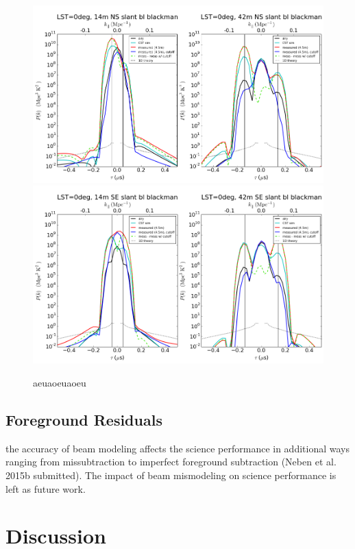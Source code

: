 \documentclass[preprint]{aastex}
\begin{document}
\begin{figure}[h]
\includegraphics[width=5.5in]{LST0deg_14m_42m_NSslantbaselinesblackman.png}
\includegraphics[width=5.5in]{LST0deg_14m_42m_SEslantbaselinesblackman.png}
\caption{aeuaoeuaoeu}
\label{fig:delayspec2}
\end{figure}


\subsection{Foreground Residuals}
the accuracy of beam modeling affects the science performance in additional ways ranging from missubtraction to imperfect foreground subtraction (Neben et al. 2015b submitted). The impact of beam mismodeling on science performance is left as future work. 




\section{Discussion}
\end{document}
